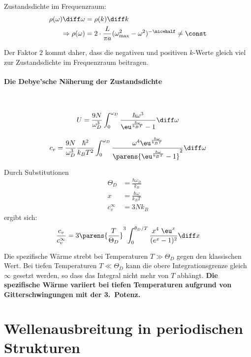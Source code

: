 			Zustandsdichte im Frequenzraum:
			\begin{align*}
				\rho(\omega) \diff \omega &= \rho(k) \diff k \\
				\Rightarrow \rho(\omega) &= 2 \cdot \frac L {\pi a} (\omega_\text{max}^2 - \omega^2)^{-\nicehalf} \neq \const
			\end{align*}

			Der Faktor $2$ kommt daher, dass die negativen und positiven $k$-Werte gleich viel zur Zustandsdichte im Frequenzraum beitragen.
		\paragraph{Die Debye'sche Näherung der Zustandsdichte} %
			~
			
			\[
				U = \frac{9N}{\omega_D^3} \int_0^{\omega_D}
					\frac{\hbar\omega^3}{\eu^{\frac{\hbar\omega}{k_B T}} - 1} \diff \omega
			\]
			
			\[
				c_v = \frac{9N}{\omega_D^3} \frac{\hbar^2}{k_B T^2} \int_0^{\omega_D}
					\frac{\omega^4 \eu^{\frac{\hbar\omega}{k_B T}}}{\parens{\eu^{\frac{\hbar\omega}{k_B T}} - 1}^2} \diff \omega
			\]
			
			Durch Substitutionen
			\begin{align*}
				\Theta_D &= \frac{\hbar \omega_D}{k_B } \tag{Debye-Temperatur} \\
				x &= \frac{\hbar\omega}{k_B T} \\
				c_v^\infty &= 3Nk_B \tag{klassischer Hochtemperaturwert}
			\end{align*}
			ergibt sich:
			\[
				\frac{c_v}{c_v^\infty} = 3 \parens{\frac{T}{\Theta_D}}^3 \int_0^{\theta_D/T} \frac{x^4 \ \eu^x}{(e^x - 1)^2} \diff x
			\]
			
			Die spezifische Wärme strebt bei Temperaturen $T \gg \Theta_D$ gegen den klassischen Wert. Bei tiefen Temperaturen $T \ll \Theta_D$ kann die obere Integrationsgrenze gleich $\infty$ gesetzt werden, so dass das Integral nicht mehr von $T$ abhängt. \textbf{Die spezifische Wärme variiert bei tiefen Temperaturen aufgrund von Gitterschwingungen mit der 3.~Potenz.}
\section{Wellenausbreitung in periodischen Strukturen} %

